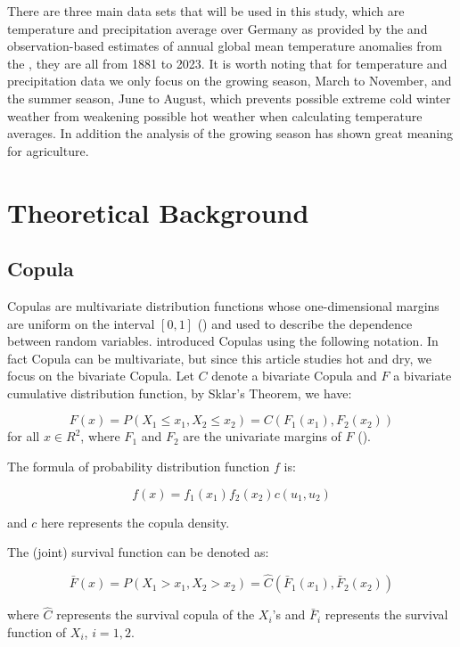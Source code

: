 \documentclass[
]{krantz}
\begin{document}
There are three main data sets that will be used in this study, which are temperature and precipitation average over Germany as provided by the \citet{dwd2024b} and observation-based estimates of annual global mean temperature anomalies from the \citet{giss2024}, they are all from 1881 to 2023. It is worth noting that for temperature and precipitation data we only focus on the growing season, March to November, and the summer season, June to August, which prevents possible extreme cold winter weather from weakening possible hot weather when calculating temperature averages. In addition the analysis of the growing season has shown great meaning for agriculture.

\section{Theoretical Background}\label{background-shiyu}

\subsection{Copula}\label{copula-shiyu}

Copulas are multivariate distribution functions whose one-dimensional margins are uniform on the interval \([0,1]\) (\citet{nelsen2006}) and used to describe the dependence between random variables. \citet{salvadori2016} introduced Copulas using the following notation. In fact Copula can be multivariate, but since this article studies hot and dry, we focus on the bivariate Copula. Let \(C\) denote a bivariate Copula and \(F\) a bivariate cumulative distribution function, by Sklar's Theorem, we have:

\[F(x) = P(X_1 \leq x_1, X_2 \leq x_2) = C(F_{1}(x_1), F_{2}(x_2)) \tag{1} \]
for all \(x \in R^2\), where \(F_1\) and \(F_2\) are the univariate margins of \(F\) (\citet{sklar1959}).

The formula of probability distribution function \(f\) is:

\[f(x) = f_1(x_1) f_2(x_2) c(u_1, u_2) \tag{2} \]

and \(c\) here represents the copula density.

The (joint) survival function can be denoted as:

\[\bar{F}(x) = P(X_1 > x_1, X_2 > x_2) = \hat{C}( \bar{F}_1(x_1), \bar{F}_2(x_2)) \tag{3} \]

where \(\hat{C}\) represents the survival copula of the \(X_i\)'s and \(\bar{F}_i\) represents the survival function of \(X_i\), \(i = 1, 2\).
\end{document}
